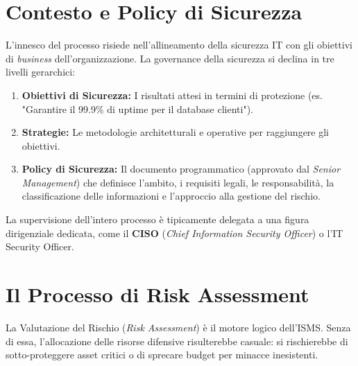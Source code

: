 \section{Contesto e Policy di Sicurezza}
L'innesco del processo risiede nell'allineamento della sicurezza IT con gli obiettivi di \textit{business} dell'organizzazione. La governance della sicurezza si declina in tre livelli gerarchici:
\begin{enumerate}
    \item \textbf{Obiettivi di Sicurezza:} I risultati attesi in termini di protezione (es. "Garantire il 99.9\% di uptime per il database clienti").
    \item \textbf{Strategie:} Le metodologie architetturali e operative per raggiungere gli obiettivi.
    \item \textbf{Policy di Sicurezza:} Il documento programmatico (approvato dal \textit{Senior Management}) che definisce l'ambito, i requisiti legali, le responsabilità, la classificazione delle informazioni e l'approccio alla gestione del rischio.
\end{enumerate}
La supervisione dell'intero processo è tipicamente delegata a una figura dirigenziale dedicata, come il \textbf{CISO} (\textit{Chief Information Security Officer}) o l'IT Security Officer.

\section{Il Processo di Risk Assessment}
La Valutazione del Rischio (\textit{Risk Assessment}) è il motore logico dell'ISMS. Senza di essa, l'allocazione delle risorse difensive risulterebbe casuale: si rischierebbe di sotto-proteggere asset critici o di sprecare budget per minacce inesistenti.

